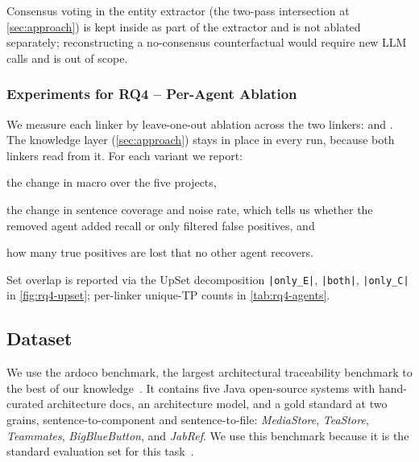 Consensus voting in the entity extractor (the two-pass intersection at \autoref{sec:approach}) is kept inside \fullVariant{} as part of the extractor and is not ablated separately; reconstructing a no-consensus counterfactual would require new LLM calls and is out of scope.



\subsubsection{Experiments for RQ4 -- Per-Agent Ablation}
\label{sec:exp:rq4}

We measure each linker by leave-one-out ablation across the two linkers: \linkerB{} and \linkerC{}.
The knowledge layer (\autoref{sec:approach}) stays in place in every run, because both linkers read from it.
For each variant we report:
\begin{enumerate*}[label=(\roman*)] \item the change in macro \fone over the
five projects, \item the change in sentence coverage and noise rate, which tells
us whether the removed agent added recall or only filtered false positives, and
\item how many true positives are lost that no other agent recovers.
\end{enumerate*} Set overlap is reported via the UpSet decomposition \texttt{|only\_E|}, \texttt{|both|}, \texttt{|only\_C|} in \autoref{fig:rq4-upset}; per-linker unique-TP counts in \autoref{tab:rq4-agents}.


\subsection{Dataset}
\label{sec:dataset}

We use the ardoco benchmark, the largest architectural traceability benchmark to the best of our knowledge~\cite{fuchs_establishing_2023}.
It contains five Java open-source systems with hand-curated architecture docs, an architecture model, and a gold standard at two grains, sentence-to-component and sentence-to-file:
\emph{MediaStore}, \emph{TeaStore}, \emph{Teammates}, \emph{BigBlueButton}, and \emph{JabRef}.
We use this benchmark because it is the standard evaluation set for this task~\cite{keim_recovering_2024,fuchs_lissa_2025}.


